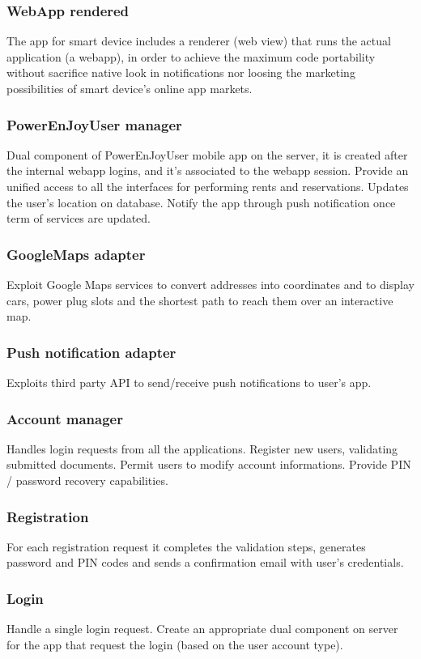 \documentclass[english]{article}
\begin{document}
		\subsubsection{WebApp rendered}
		The app for smart device includes a renderer (web view) that runs the actual application (a webapp), in order to achieve the maximum code portability without sacrifice native look in notifications nor loosing the marketing possibilities of smart device's online app markets.
	\subsubsection{PowerEnJoyUser manager}
	Dual component of PowerEnJoyUser mobile app on the server, it is created after the internal webapp logins, and it's associated to the webapp session. Provide an unified access to all the interfaces for performing rents and reservations. Updates the user's location on database. Notify the app through push notification once term of services are updated.
	\subsubsection{GoogleMaps adapter}
	Exploit Google Maps services to convert addresses into coordinates and to display cars, power plug slots and the shortest path to reach them over an interactive map.
	\subsubsection{Push notification adapter}
	Exploits third party API to send/receive push notifications to user's app.
	\subsubsection{Account manager}
	Handles login requests from all the applications. Register new users, validating  submitted documents. Permit users to modify account informations. Provide PIN / password recovery capabilities.
		\subsubsection{Registration }
		For each registration request it completes the validation steps, generates password and PIN codes and sends a confirmation email with user's credentials.
		\subsubsection{Login}
		Handle a single login request. Create an appropriate dual component on server for the app that request the login (based on the user account type).
\end{document}
